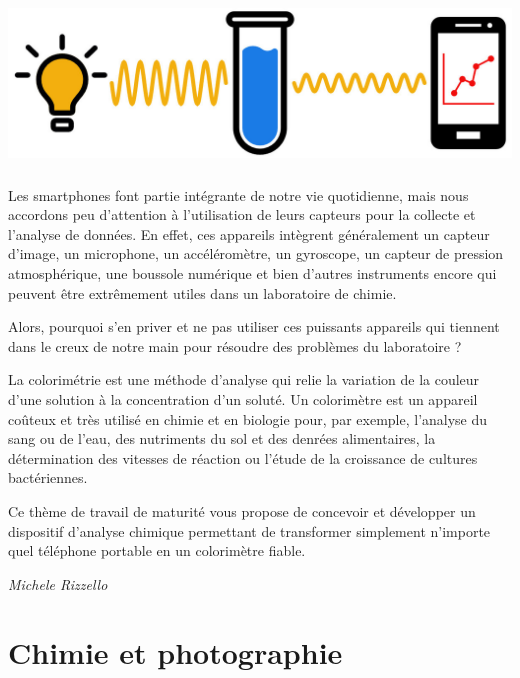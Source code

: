 \documentclass[
  10pt,
  french,
  a5paper,
  openany]{book}
\newenvironment{signature}{\begin{flushright}}{\end{flushright}}
\begin{document}
\begin{center}
\includegraphics[width=\textwidth,height=12em]{images/analyses-chimiques-telephone-portable.jpg}

\end{center}

Les smartphones font partie intégrante de notre vie quotidienne, mais nous accordons peu d'attention à l'utilisation de leurs capteurs pour la collecte et l'analyse de données. En effet, ces appareils intègrent généralement un capteur d'image, un microphone, un accéléromètre, un gyroscope, un capteur de pression atmosphérique, une boussole numérique et bien d'autres instruments encore qui peuvent être extrêmement utiles dans un laboratoire de chimie.

Alors, pourquoi s'en priver et ne pas utiliser ces puissants appareils qui tiennent dans le creux de notre main pour résoudre des problèmes du laboratoire ?

La colorimétrie est une méthode d'analyse qui relie la variation de la couleur d'une solution à la concentration d'un soluté. Un colorimètre est un appareil coûteux et très utilisé en chimie et en biologie pour, par exemple, l'analyse du sang ou de l'eau, des nutriments du sol et des denrées alimentaires, la détermination des vitesses de réaction ou l'étude de la croissance de cultures bactériennes.

Ce thème de travail de maturité vous propose de concevoir et développer un dispositif d'analyse chimique permettant de transformer simplement n'importe quel téléphone portable en un colorimètre fiable.

\begin{signature}
\emph{Michele Rizzello}

\end{signature}

\hypertarget{chimie-et-photographie}{%
\chapter{Chimie et photographie}\label{chimie-et-photographie}}
\end{document}
